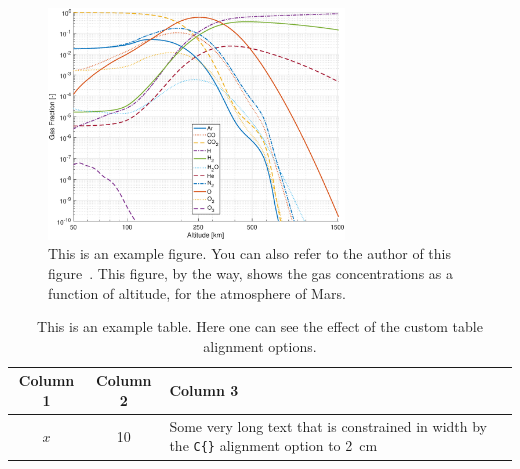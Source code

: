 \begin{figure}[b!]
	\centering
	\includegraphics[width=0.7\textwidth]{figures/composition}
	\caption[This is an example figure. You can also refer to the author of this figure.]{This is an example figure. You can also refer to the author of this figure~\citep{MST001}. This figure, by the way, shows the gas concentrations as a function of altitude, for the atmosphere of Mars.}
	\label{fig:figure}
\end{figure}

\begin{table}[htb!]
	\centering
	\caption[This is an example table.]{This is an example table. Here one can see the effect of the custom table alignment options.}
	\label{tab:table}
	\begin{tabular}{ccC{2cm}}
		\toprule
		\textbf{Column 1} & \textbf{Column 2} & \textbf{Column 3} \\
		\midrule
		$x$ & 10 & Some very long text that is constrained in width by the \verb|C{}| alignment option to \SI{2}{\centi\meter} \\
		\bottomrule
	\end{tabular}
\end{table}

